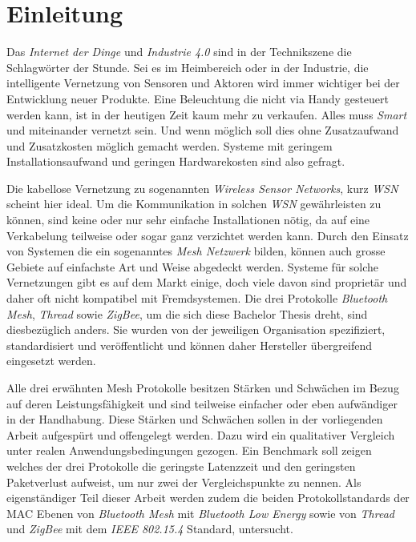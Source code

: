 \clearpage

\section{Einleitung}\label{sec:Einleitung}

Das \textit{Internet der Dinge} und \textit{Industrie 4.0} sind in der Technikszene die Schlagwörter der Stunde.
Sei es im Heimbereich oder in der Industrie, die intelligente Vernetzung von Sensoren und Aktoren wird immer wichtiger bei der Entwicklung neuer Produkte.
Eine Beleuchtung die nicht via Handy gesteuert werden kann, ist in der heutigen Zeit kaum mehr zu verkaufen.
Alles muss \textit{Smart} und miteinander vernetzt sein.
Und wenn möglich soll dies ohne Zusatzaufwand und Zusatzkosten möglich gemacht werden.
Systeme mit geringem Installationsaufwand und geringen Hardwarekosten sind also gefragt.

Die kabellose Vernetzung zu sogenannten \textit{Wireless Sensor Networks}, kurz \textit{WSN} scheint hier ideal.
Um die Kommunikation in solchen \textit{WSN} gewährleisten zu können, sind keine oder nur sehr einfache Installationen nötig, da auf eine Verkabelung teilweise oder sogar ganz verzichtet werden kann.
Durch den Einsatz von Systemen die ein sogenanntes \textit{Mesh Netzwerk} bilden, können auch grosse Gebiete auf einfachste Art und Weise abgedeckt werden. 
Systeme für solche Vernetzungen gibt es auf dem Markt einige, doch viele davon sind proprietär und daher oft nicht kompatibel mit Fremdsystemen.
Die drei Protokolle \textit{Bluetooth Mesh}, \textit{Thread} sowie \textit{ZigBee}, um die sich diese Bachelor Thesis dreht, sind diesbezüglich anders.
Sie wurden von der jeweiligen Organisation spezifiziert, standardisiert und veröffentlicht und können daher Hersteller übergreifend eingesetzt werden.

Alle drei erwähnten Mesh Protokolle besitzen Stärken und Schwächen im Bezug auf deren Leistungsfähigkeit und sind teilweise einfacher oder eben aufwändiger in der Handhabung.  
Diese Stärken und Schwächen sollen in der vorliegenden Arbeit aufgespürt und offengelegt werden.
Dazu wird ein qualitativer Vergleich unter realen Anwendungsbedingungen gezogen.
Ein Benchmark soll zeigen welches der drei Protokolle die geringste Latenzzeit und den geringsten Paketverlust aufweist, um nur zwei der Vergleichspunkte zu nennen.
Als eigenständiger Teil dieser Arbeit werden zudem die beiden Protokollstandards der MAC Ebenen von \textit{Bluetooth Mesh} mit \textit{Bluetooth Low Energy} sowie von \textit{Thread} und \textit{ZigBee} mit dem \textit{IEEE 802.15.4} Standard, untersucht.

